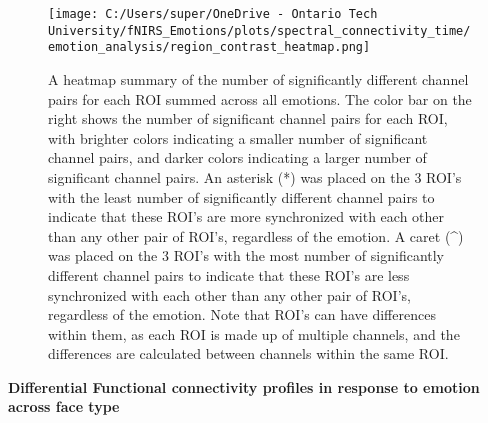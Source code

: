 \begin{figure}[H]
  \centering
  \texttt{[image: C:/Users/super/OneDrive - Ontario Tech University/fNIRS\_Emotions/plots/spectral\_connectivity\_time/emotion\_analysis/region\_contrast\_heatmap.png]}
  \caption[FC: Count of Significantly Different Channel Pairs by ROI]{A heatmap summary of the number of significantly different channel pairs for each ROI summed across all emotions. 
  The color bar on the right shows the number of significant channel pairs for each ROI, with brighter colors indicating a smaller number of significant channel pairs, and darker colors indicating a larger number of significant channel pairs.
  An asterisk (*) was placed on the 3 ROI's with the least number of significantly different channel pairs to indicate that these ROI's are more synchronized with each other than any other pair of ROI's, regardless of the emotion.
  A caret (\textasciicircum) was placed on the 3 ROI's with the most number of significantly different channel pairs to indicate that these ROI's are less synchronized with each other than any other pair of ROI's, regardless of the emotion.
  Note that ROI's can have differences within them, as each ROI is made up of multiple channels, and the differences are calculated between channels within the same ROI.}
  \label{fig:fc_region_summary_analysis}
\end{figure}

\noindent
\textbf{Differential Functional connectivity profiles in response to emotion across face type}

